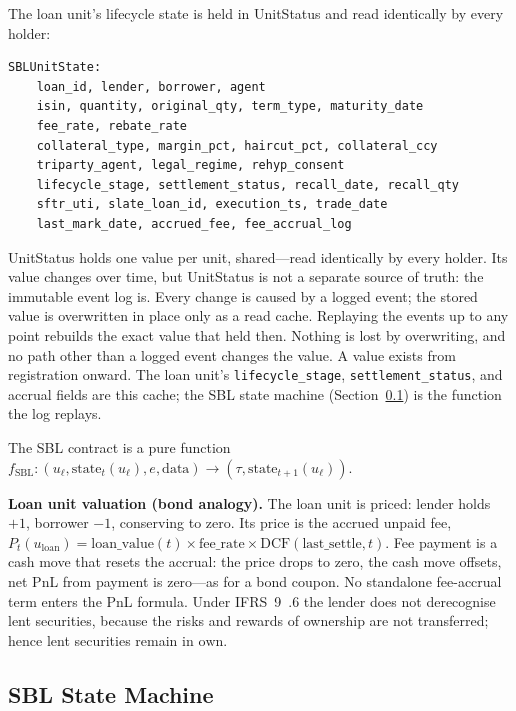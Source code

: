 The loan unit's lifecycle state is held in UnitStatus and read identically by every holder:

\begin{lstlisting}
SBLUnitState:
    loan_id, lender, borrower, agent
    isin, quantity, original_qty, term_type, maturity_date
    fee_rate, rebate_rate
    collateral_type, margin_pct, haircut_pct, collateral_ccy
    triparty_agent, legal_regime, rehyp_consent
    lifecycle_stage, settlement_status, recall_date, recall_qty
    sftr_uti, slate_loan_id, execution_ts, trade_date
    last_mark_date, accrued_fee, fee_accrual_log
\end{lstlisting}

\begin{remark}
UnitStatus holds one value per unit, shared---read identically by every holder. Its value changes over time, but UnitStatus is not a separate source of truth: the immutable event log is. Every change is caused by a logged event; the stored value is overwritten in place only as a read cache. Replaying the events up to any point rebuilds the exact value that held then. Nothing is lost by overwriting, and no path other than a logged event changes the value. A value exists from registration onward. The loan unit's \texttt{lifecycle\_stage}, \texttt{settlement\_status}, and accrual fields are this cache; the SBL state machine (Section~\ref{sec:sbl-state-machine}) is the function the log replays.
\end{remark}

\noindent The SBL contract is a pure function $f_{\mathrm{SBL}}:(u_\ell,\mathrm{state}_t(u_\ell),e,\mathrm{data}) \to (\tau,\mathrm{state}_{t+1}(u_\ell))$.

\noindent\textbf{Loan unit valuation (bond analogy).} The loan unit is priced: lender holds $+1$, borrower $-1$, conserving to zero. Its price is the accrued unpaid fee, $P_t(u_{\mathrm{loan}}) = \mathrm{loan\_value}(t)\times\mathrm{fee\_rate}\times\mathrm{DCF}(\mathrm{last\_settle},t)$. Fee payment is a cash move that resets the accrual: the price drops to zero, the cash move offsets, net PnL from payment is zero---as for a bond coupon. No standalone fee-accrual term enters the PnL formula. Under IFRS~9~.6 the lender does not derecognise lent securities, because the risks and rewards of ownership are not transferred; hence lent securities remain in $\mathrm{own}$.

\subsection{SBL State Machine}
\label{sec:sbl-state-machine}

